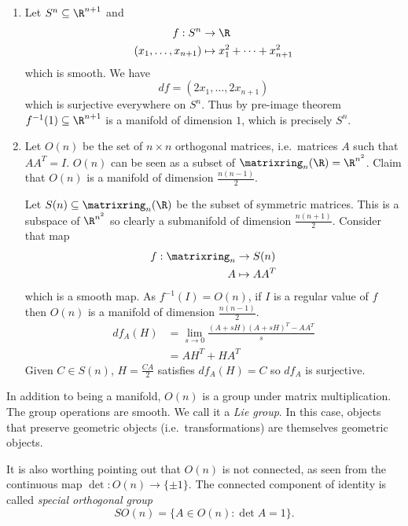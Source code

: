 \documentclass[a4paper]{article}
\begin{document}
\begin{eg}\leavevmode
  \begin{enumerate}
  \item Let \(S^n \subseteq \R^{n + 1}\) and
  \begin{align*}
    f: S^n &\to \R \\
    (x_1, \dots, x_{n + 1}) &\mapsto x_1^2 + \dots + x_{n + 1}^2
  \end{align*}
  which is smooth. We have
  \[
    df = (2x_1, \dots, 2x_{n + 1})
  \]
  which is surjective everywhere on \(S^n\). Thus by pre-image theorem \(f^{-1}(1) \subseteq \R^{n + 1}\) is a manifold of dimension \(1\), which is precisely \(S^n\).
\item Let \(O(n)\) be the set of \(n \times n\) orthogonal matrices, i.e.\ matrices \(A\) such that \(AA^T = I\). \(O(n)\) can be seen as a subset of \(\matrixring_n(\R) = \R^{n^2}\). Claim that \(O(n)\) is a manifold of dimension \(\frac{n(n - 1)}{2}\).

  Let \(S(n) \subseteq \matrixring_n(\R)\) be the subset of symmetric matrices. This is a subspace of \(\R^{n^2}\) so clearly a submanifold of dimension \(\frac{n(n + 1)}{2}\). Consider that map
  \begin{align*}
    f: \matrixring_n &\to S(n) \\
    A &\mapsto AA^T
  \end{align*}
  which is a smooth map. As \(f^{-1}(I) = O(n)\), if \(I\) is a regular value of \(f\) then \(O(n)\) is a manifold of dimension \(\frac{n(n - 1)}{2}\).
  \begin{align*}
    df_A(H) &= \lim_{s \to 0} \frac{(A + sH)(A + sH)^T - AA^T}{s} \\
            &= AH^T + HA^T
  \end{align*}
  Given \(C \in S(n)\), \(H = \frac{CA}{2}\) satisfies \(df_A(H) = C\) so \(df_A\) is surjective.
  \end{enumerate}
\end{eg}

\begin{remark}
  In addition to being a manifold, \(O(n)\) is a group under matrix multiplication. The group operations are smooth. We call it a \emph{Lie group}. In this case, objects that preserve geometric objects (i.e.\ transformations) are themselves geometric objects.

  It is also worthing pointing out that \(O(n)\) is not connected, as seen from the continuous map \(\det: O(n) \to \{\pm 1\}\). The connected component of identity is called \emph{special orthogonal group}
  \[
    SO(n) = \{A \in O(n): \det A = 1\}.
  \]
\end{remark}
\end{document}
